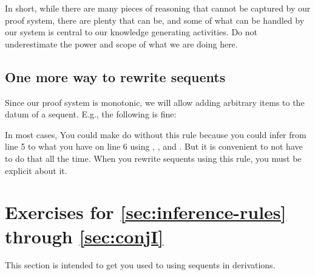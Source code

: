 In short, while there are many pieces of reasoning that cannot be captured by 
our proof system, there are plenty that can be, and some of what can be handled 
by our system is central to our knowledge generating activities.  Do not 
underestimate the power and scope of what we are doing here.


\subsection{One more way to rewrite sequents}\label{sec:seqRW}

Since our proof system is monotonic, we will allow adding arbitrary items to the 
datum of a sequent. E.g., the following is fine:

\begin{itemize}

 \aitem {}
 \aitem {}

\end{itemize}

In most cases, You could make do without this rule because you could infer from 
line 5 to what you have on line 6 using , \conjI, and \conjE. But it is 
convenient to not have to do that all the time. When you rewrite sequents using 
this rule, you must be explicit about it.



\section{Exercises for \ref{sec:inference-rules} through \ref{sec:conjI}}

This section is intended to get you used to using sequents in derivations.

